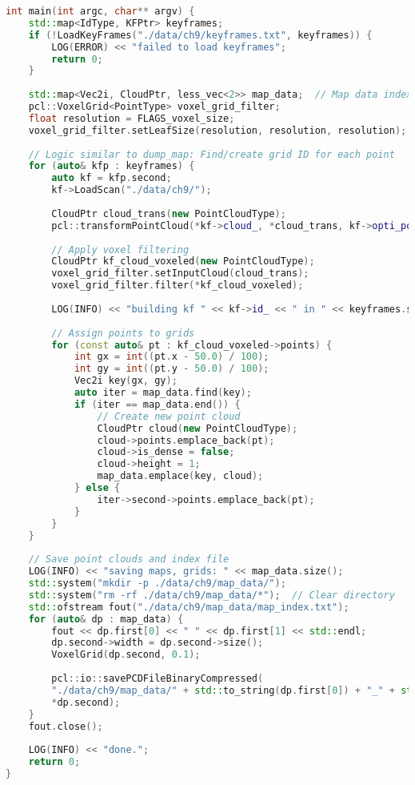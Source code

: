 \begin{lstlisting}[language=c++,caption=src/ch9/split\_map.cc]
int main(int argc, char** argv) {	
	std::map<IdType, KFPtr> keyframes;
	if (!LoadKeyFrames("./data/ch9/keyframes.txt", keyframes)) {
		LOG(ERROR) << "failed to load keyframes";
		return 0;
	}
	
	std::map<Vec2i, CloudPtr, less_vec<2>> map_data;  // Map data indexed by grid ID
	pcl::VoxelGrid<PointType> voxel_grid_filter;
	float resolution = FLAGS_voxel_size;
	voxel_grid_filter.setLeafSize(resolution, resolution, resolution);
	
	// Logic similar to dump_map: Find/create grid ID for each point
	for (auto& kfp : keyframes) {
		auto kf = kfp.second;
		kf->LoadScan("./data/ch9/");
		
		CloudPtr cloud_trans(new PointCloudType);
		pcl::transformPointCloud(*kf->cloud_, *cloud_trans, kf->opti_pose_2_.matrix());
		
		// Apply voxel filtering
		CloudPtr kf_cloud_voxeled(new PointCloudType);
		voxel_grid_filter.setInputCloud(cloud_trans);
		voxel_grid_filter.filter(*kf_cloud_voxeled);
		
		LOG(INFO) << "building kf " << kf->id_ << " in " << keyframes.size();
		
		// Assign points to grids
		for (const auto& pt : kf_cloud_voxeled->points) {
			int gx = int((pt.x - 50.0) / 100);
			int gy = int((pt.y - 50.0) / 100);
			Vec2i key(gx, gy);
			auto iter = map_data.find(key);
			if (iter == map_data.end()) {
				// Create new point cloud
				CloudPtr cloud(new PointCloudType);
				cloud->points.emplace_back(pt);
				cloud->is_dense = false;
				cloud->height = 1;
				map_data.emplace(key, cloud);
			} else {
				iter->second->points.emplace_back(pt);
			}
		}
	}
	
	// Save point clouds and index file
	LOG(INFO) << "saving maps, grids: " << map_data.size();
	std::system("mkdir -p ./data/ch9/map_data/");
	std::system("rm -rf ./data/ch9/map_data/*");  // Clear directory
	std::ofstream fout("./data/ch9/map_data/map_index.txt");
	for (auto& dp : map_data) {
		fout << dp.first[0] << " " << dp.first[1] << std::endl;
		dp.second->width = dp.second->size();
		VoxelGrid(dp.second, 0.1);
		
		pcl::io::savePCDFileBinaryCompressed(
		"./data/ch9/map_data/" + std::to_string(dp.first[0]) + "_" + std::to_string(dp.first[1]) + ".pcd",
		*dp.second);
	}
	fout.close();
	
	LOG(INFO) << "done.";
	return 0;
}
\end{lstlisting}

